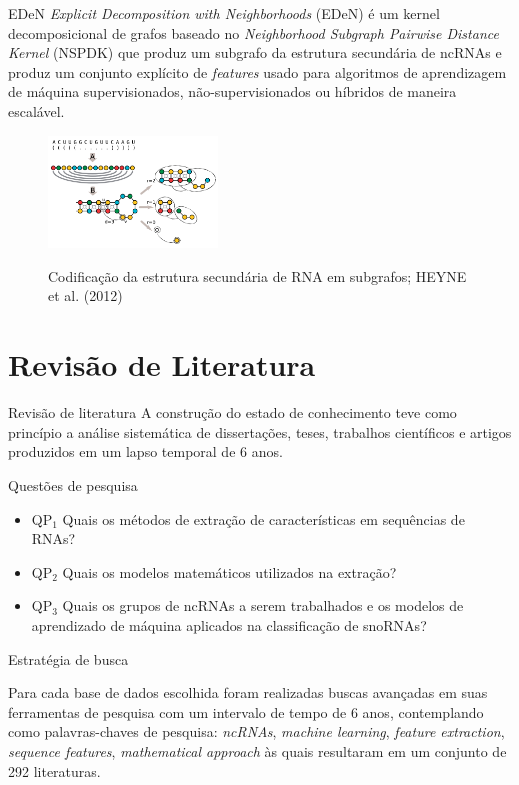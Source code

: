 \documentclass{apresentacao-ifb}
\begin{document}
\begin{frame}{EDeN}
    \textit{Explicit Decomposition with Neighborhoods} (EDeN) é um kernel decomposicional de grafos baseado no \textit{Neighborhood Subgraph Pairwise Distance Kernel} (NSPDK) que produz um subgrafo da estrutura secundária de ncRNAs e produz um conjunto explícito de \textit{features} usado para algoritmos de aprendizagem de máquina supervisionados, não-supervisionados ou híbridos de maneira escalável.

    \begin{figure}[h]
    \centering
    \includegraphics[width=0.4\textwidth]{eden_graph.png}
    \label{fig:eden}
    \caption{Codificação da estrutura secundária de RNA em subgrafos; HEYNE et al. (2012)}
    \end{figure}
    
\end{frame}

\section{Revisão de Literatura}

\begin{frame}{Revisão de literatura}
A construção do estado de conhecimento teve como princípio a análise sistemática de
dissertações, teses, trabalhos científicos e artigos produzidos em um lapso temporal de 6 anos.

\end{frame}
\begin{frame}{Questões de pesquisa}
    \begin{itemize}
   \item QP$_{1}$ Quais os métodos de extração de características em sequências de RNAs?
  \item QP$_{2}$ Quais os modelos matemáticos utilizados na extração?
  \item QP$_{3}$ Quais os grupos de ncRNAs a serem trabalhados e os modelos de aprendizado de máquina aplicados na classificação de snoRNAs?
\end{itemize}
\end{frame}
\begin{frame}{Estratégia de busca}

Para cada base de dados escolhida foram realizadas buscas avançadas em suas ferramentas
de pesquisa com um intervalo de tempo de 6 anos, contemplando como palavras-chaves de pesquisa: \textit{ncRNAs}, \textit{machine learning}, \textit{feature extraction}, \textit{sequence features}, \textit{mathematical approach} às quais resultaram em um conjunto de 292 literaturas.

\end{frame}
\end{document}
